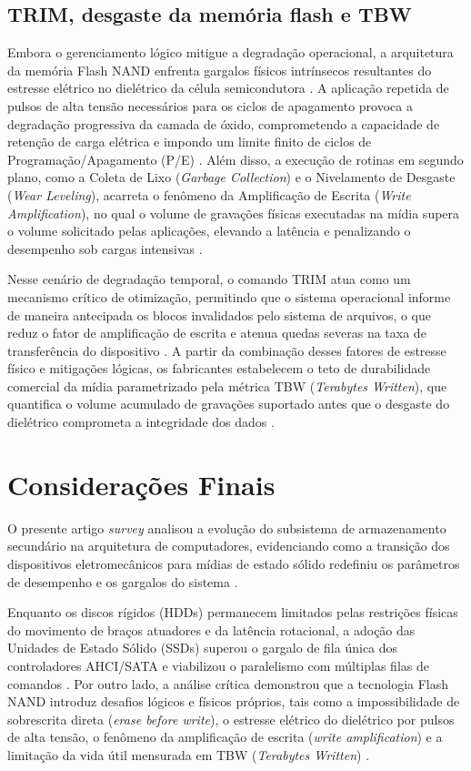 \documentclass[12pt]{article}
\begin{document}
\subsection{TRIM, desgaste da memória flash e TBW}
Embora o gerenciamento lógico mitigue a degradação operacional, a arquitetura da memória Flash NAND enfrenta gargalos físicos intrínsecos resultantes do estresse elétrico no dielétrico da célula semicondutora \cite{santos2014, stallings2017}. A aplicação repetida de pulsos de alta tensão necessários para os ciclos de apagamento provoca a degradação progressiva da camada de óxido, comprometendo a capacidade de retenção de carga elétrica e impondo um limite finito de ciclos de Programação/Apagamento (P/E) \cite{santos2014, stallings2017}. Além disso, a execução de rotinas em segundo plano, como a Coleta de Lixo (\textit{Garbage Collection}) e o Nivelamento de Desgaste (\textit{Wear Leveling}), acarreta o fenômeno da Amplificação de Escrita (\textit{Write Amplification}), no qual o volume de gravações físicas executadas na mídia supera o volume solicitado pelas aplicações, elevando a latência e penalizando o desempenho sob cargas intensivas \cite{santos2014}. 

Nesse cenário de degradação temporal, o comando TRIM atua como um mecanismo crítico de otimização, permitindo que o sistema operacional informe de maneira antecipada os blocos invalidados pelo sistema de arquivos, o que reduz o fator de amplificação de escrita e atenua quedas severas na taxa de transferência do dispositivo \cite{ribeiro2017, stallings2017}. A partir da combinação desses fatores de estresse físico e mitigações lógicas, os fabricantes estabelecem o teto de durabilidade comercial da mídia parametrizado pela métrica TBW (\textit{Terabytes Written}), que quantifica o volume acumulado de gravações suportado antes que o desgaste do dielétrico comprometa a integridade dos dados \cite{stallings2017}.


\section{Considerações Finais}

O presente artigo \textit{survey} analisou a evolução do subsistema de armazenamento secundário na arquitetura de computadores, evidenciando como a transição dos dispositivos eletromecânicos para mídias de estado sólido redefiniu os parâmetros de desempenho e os gargalos do sistema \cite{stallings2017, silva2025}. 

Enquanto os discos rígidos (HDDs) permanecem limitados pelas restrições físicas do movimento de braços atuadores e da latência rotacional, a adoção das Unidades de Estado Sólido (SSDs) superou o gargalo de fila única dos controladores AHCI/SATA e viabilizou o paralelismo com múltiplas filas de comandos \cite{george2023}. Por outro lado, a análise crítica demonstrou que a tecnologia Flash NAND introduz desafios lógicos e físicos próprios, tais como a impossibilidade de sobrescrita direta (\textit{erase before write}), o estresse elétrico do dielétrico por pulsos de alta tensão, o fenômeno da amplificação de escrita (\textit{write amplification}) e a limitação da vida útil mensurada em TBW (\textit{Terabytes Written}) \cite{ribeiro2017, santos2014}. 
\end{document}
